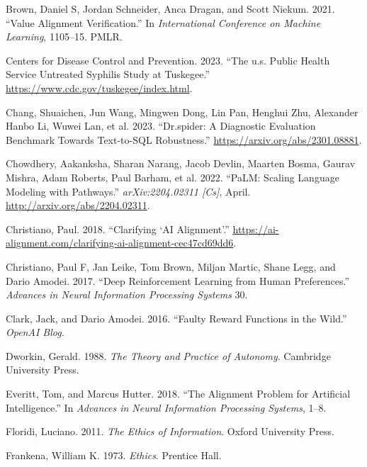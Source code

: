 \documentclass[
  letterpaper,
  numbers=noenddot,
  DIV=11,
  oneside]{scrreprt}
\newlength{\cslhangindent}
\newenvironment{CSLReferences}[2] %
 {\begin{list}{}{%
  \setlength{\itemindent}{0pt}
  \setlength{\leftmargin}{0pt}
  \setlength{\parsep}{0pt}
  \ifodd #1
   \setlength{\leftmargin}{\cslhangindent}
   \setlength{\itemindent}{-1\cslhangindent}
  \fi
  \setlength{\itemsep}{#2\baselineskip}}}
 {\end{list}}
\theoremstyle{remark}
\begin{document}
\begin{CSLReferences}{1}{0}
Brown, Daniel S, Jordan Schneider, Anca Dragan, and Scott Niekum. 2021.
{``Value Alignment Verification.''} In \emph{International Conference on
Machine Learning}, 1105--15. PMLR.

Centers for Disease Control and Prevention. 2023. {``The u.s. Public
Health Service Untreated Syphilis Study at Tuskegee.''}
\url{https://www.cdc.gov/tuskegee/index.html}.

Chang, Shuaichen, Jun Wang, Mingwen Dong, Lin Pan, Henghui Zhu,
Alexander Hanbo Li, Wuwei Lan, et al. 2023. {``Dr.spider: A Diagnostic
Evaluation Benchmark Towards Text-to-SQL Robustness.''}
\url{https://arxiv.org/abs/2301.08881}.

Chowdhery, Aakanksha, Sharan Narang, Jacob Devlin, Maarten Bosma, Gaurav
Mishra, Adam Roberts, Paul Barham, et al. 2022. {``{PaLM}: {Scaling}
{Language} {Modeling} with {Pathways}.''} \emph{arXiv:2204.02311
{[}Cs{]}}, April. \url{http://arxiv.org/abs/2204.02311}.

Christiano, Paul. 2018. {``Clarifying {`AI Alignment'}.''}
\url{https://ai-alignment.com/clarifying-ai-alignment-cec47cd69dd6}.

Christiano, Paul F, Jan Leike, Tom Brown, Miljan Martic, Shane Legg, and
Dario Amodei. 2017. {``Deep Reinforcement Learning from Human
Preferences.''} \emph{Advances in Neural Information Processing Systems}
30.

Clark, Jack, and Dario Amodei. 2016. {``Faulty Reward Functions in the
Wild.''} \emph{OpenAI Blog}.

Dworkin, Gerald. 1988. \emph{The Theory and Practice of Autonomy}.
Cambridge University Press.

Everitt, Tom, and Marcus Hutter. 2018. {``The Alignment Problem for
Artificial Intelligence.''} In \emph{Advances in Neural Information
Processing Systems}, 1--8.

Floridi, Luciano. 2011. \emph{The Ethics of Information}. Oxford
University Press.

Frankena, William K. 1973. \emph{Ethics}. Prentice Hall.


\end{CSLReferences}
\end{document}
